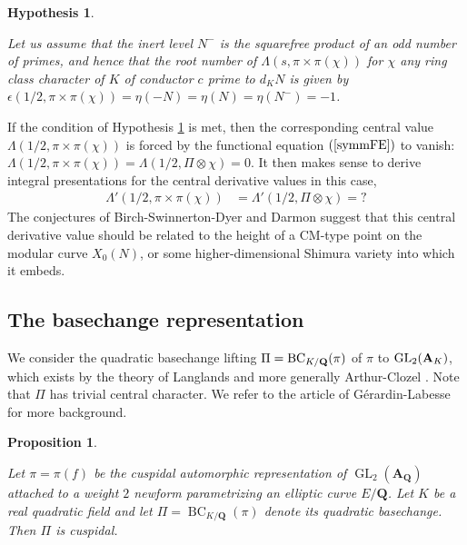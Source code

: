 \documentclass{amsart}
\newtheorem{proposition}[theorem]{Proposition}
\newtheorem{hypothesis}[theorem]{Hypothesis}
\theoremstyle{definition}
\begin{document}
\begin{hypothesis}\label{EHH} 

Let us assume that the inert level $N^-$ is the squarefree product of an odd number of primes,
and hence that the root number of $\Lambda(s, \pi \times \pi(\chi))$ for $\chi$ any ring class character of $K$ of conductor 
$c$ prime to $d_KN$ is given by $\epsilon(1/2, \pi \times \pi(\chi)) = \eta(-N) = \eta(N) = \eta(N^-)=-1$. \end{hypothesis}

If the condition of Hypothesis \ref{EHH} is met, then the corresponding central value 
$\Lambda(1/2, \pi \times \pi(\chi))$ is forced by the functional equation $(\ref{symmFE})$ to vanish: 
$\Lambda(1/2, \pi \times \pi(\chi)) = \Lambda(1/2, \Pi \otimes \chi) =0$.
It then makes sense to derive integral presentations for the central derivative values in this case, 
\begin{align*} \Lambda'(1/2, \pi \times \pi(\chi)) &= \Lambda'(1/2, \Pi \otimes \chi) = \textit{?} \end{align*}
The conjectures of Birch-Swinnerton-Dyer and Darmon \cite[Conjecture 5.6]{Da} suggest that this central derivative value should 
be related to the height of a CM-type point on the modular curve $X_0(N)$, or some higher-dimensional Shimura variety into which it embeds. 

\subsection{The basechange representation} 

We consider the quadratic basechange lifting $\Pi = \operatorname{BC}_{K/{\bf{Q}}}(\pi)$ of $\pi$ to $\operatorname{GL}_2({\bf{A}}_K)$,
which exists by the theory of Langlands \cite{La} and more generally Arthur-Clozel \cite{AC}. Note that $\Pi$ has trivial central character. 
We refer to the article of G\'erardin-Labesse \cite{GL} for more background. 

\begin{proposition}\label{cuspidal} 

Let $\pi = \pi(f)$ be the cuspidal automorphic representation of 
$\operatorname{GL}_2(\mathbf A_\mathbf Q)$ attached to a weight $2$ newform parametrizing an elliptic curve $E/\mathbf Q$.
Let $K$ be a real quadratic field and let $\Pi = \operatorname{BC}_{K/\mathbf Q}(\pi)$ denote its quadratic basechange. Then $\Pi$ is cuspidal.

\end{proposition}
\end{document}
